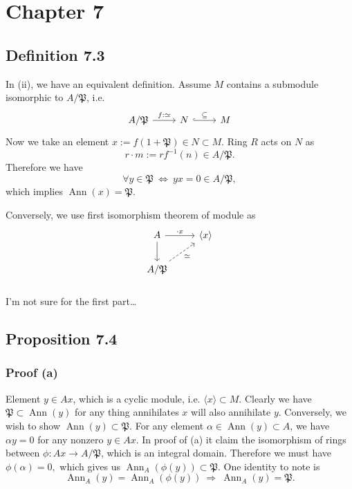 \section{Chapter 7}

\subsection{Definition 7.3}

In (ii), we have an equivalent definition. 
Assume $M$ contains a submodule isomorphic to $A/\mathfrak P$, i.e. 
\[\begin{tikzcd}
	{A/\mathfrak{P}} & N & M
	\arrow["\subseteq", hook, from=1-2, to=1-3]
	\arrow["{f:\simeq}", from=1-1, to=1-2]
\end{tikzcd}\]
Now we take an element $x:=f(1+\mathfrak P)\in N\subset M$. Ring $R$ acts on $N$ as 
$$r\cdot m:= rf^{-1}(n)\in A/\mathfrak P.$$
Therefore we have $$\forall y\in\mathfrak P ~\Leftrightarrow~ yx=0\in A/\mathfrak P,$$which implies $\operatorname{Ann}(x)=\mathfrak P$.

Conversely, we use first isomorphism theorem of module as 
\[\begin{tikzcd}
	A & {\langle x\rangle} \\
	{A/\mathfrak P}
	\arrow[from=1-1, to=2-1]
	\arrow["{\cdot x}", from=1-1, to=1-2]
	\arrow["\simeq"', dashed, from=2-1, to=1-2]
\end{tikzcd}\]

\subsubsection{}
I'm not sure for the first part\dots

\subsection{Proposition 7.4}

\subsubsection{Proof (a)}
Element $y\in Ax$, which is a cyclic module, i.e. $\langle x\rangle\subset M$.
Clearly we have $\mathfrak P\subset \operatorname{Ann}(y)$ for any thing annihilates $x$ will also annihilate $y$. 
Conversely, we wish to show $\operatorname{Ann}(y)\subset \mathfrak P$. For any element $\alpha\in \operatorname{Ann}(y)\subset A$, we have $\alpha y=0$ for any nonzero $y\in Ax$. In proof of (a) it claim the isomorphism of rings between $\phi:Ax\to A/\mathfrak P$, which is an integral domain. Therefore we must have $\phi(\alpha)=0,$ which gives us $\operatorname{Ann}_A(\phi(y))\subset \mathfrak P$. One identity to note is 
$$\operatorname{Ann}_A(y)=\operatorname{Ann}_A(\phi(y)) ~\Rightarrow~ \operatorname{Ann}_A(y)=\mathfrak P.$$